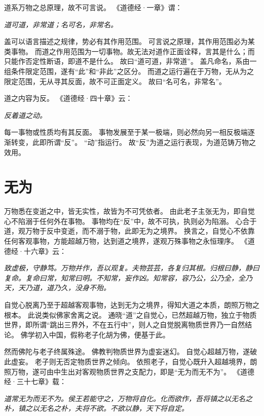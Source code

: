 \documentclass[11pt]{article}
\begin{document}
\par

道系万物之总原理，故不可言说。
《道德经·一章》谓：

\textit{道可道，非常道；名可名，非常名。}

盖可以语言描述之规律，势必有其作用范围。
可言说之原理，其作用范围必为某类事物。
而道之作用范围为一切事物。故无法对道作正面诠释，言其是什么；而只能作否定性断语，即道不是什么。
故曰“道可道，非常道”。
盖凡命名，系由一组条件限定范围，遂有“此”和“非此”之区分。
而道之运行遍在于万物，无从为之限定范围，无从寻其反面，故不可正面定义。
故曰“名可名，非常名”。

\par

道之内容为反。
《道德经·四十章》云：

\textit{反着道之动。}

每一事物或性质均有其反面。
事物发展至于某一极端，则必然向另一相反极端逐渐转变，此即所谓“反”。
“动”指运行。
故“反”为道之运行表现，为道范铸万物之效用。
  
\section{无为}
万物悉在变逝之中，皆无实性，故皆为不可凭依者。
由此老子主张无为，即自觉心不陷溺于任何外在事物。
事物均在“反”中，故不可执，执则必为陷溺。
心合于道，观万物于反中变逝，而不溺于物，此即无为之境界。
换言之，自觉心不依靠任何客观事物，方能超越万物，达到道之境界，遂观万殊事物之永恒理序。
《道德经·十六章》云：

\textit{致虚极，守静笃。万物并作，吾以观复。夫物芸芸，各复归其根。归根曰静，静曰复命。复命曰常，知常曰明。不知常，妄作凶。知常容，容乃公，公乃全，全乃天，天乃道，道乃久，没身不殆。}

\par

自觉心脱离乃至于超越客观事物，达到无为之境界，得知大道之本质，朗照万物之根本。
此说类似佛家舍离之说。
通晓“道”之自觉心，已然超越万物，独立于物质世界，即所谓“跳出三界外，不在五行中”，则人之自觉脱离物质世界乃一自然结论。
佛学初入中国，假称老子化胡为佛，便基于此。

\par

然而佛陀与老子终属殊途。
佛教判物质世界为虚妄迷幻。
自觉心超越万物，遂破此虚妄。
老子则无否定物质世界之倾向。
依照老子，自觉心既升入超越境界，朗照万物，遂可由中生出对客观物质世界之支配力，即是“无为而无不为”。
《道德经·三十七章》载：

\textit{道常无为而无不为。侯王若能守之，万物将自化。化而欲作，吾将镇之以无名之朴，镇之以无名之朴，夫将不欲。不欲以静，天下将自定。} 
\end{document}
